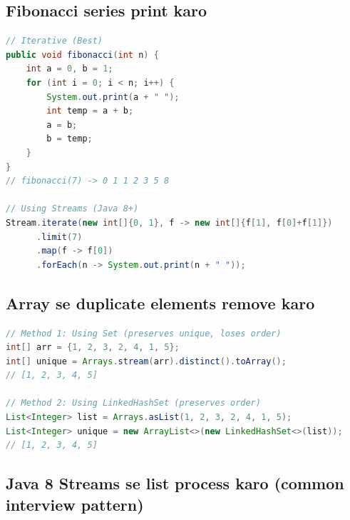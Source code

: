 \documentclass[12pt,a4paper]{article}
\begin{document}
\subsection{Fibonacci series print karo}

\begin{answerbox}
\begin{lstlisting}[language=Java]
// Iterative (Best)
public void fibonacci(int n) {
    int a = 0, b = 1;
    for (int i = 0; i < n; i++) {
        System.out.print(a + " ");
        int temp = a + b;
        a = b;
        b = temp;
    }
}
// fibonacci(7) -> 0 1 1 2 3 5 8

// Using Streams (Java 8+)
Stream.iterate(new int[]{0, 1}, f -> new int[]{f[1], f[0]+f[1]})
      .limit(7)
      .map(f -> f[0])
      .forEach(n -> System.out.print(n + " "));
\end{lstlisting}
\end{answerbox}

\subsection{Array se duplicate elements remove karo}

\begin{answerbox}
\begin{lstlisting}[language=Java]
// Method 1: Using Set (preserves unique, loses order)
int[] arr = {1, 2, 3, 2, 4, 1, 5};
int[] unique = Arrays.stream(arr).distinct().toArray();
// [1, 2, 3, 4, 5]

// Method 2: Using LinkedHashSet (preserves order)
List<Integer> list = Arrays.asList(1, 2, 3, 2, 4, 1, 5);
List<Integer> unique = new ArrayList<>(new LinkedHashSet<>(list));
// [1, 2, 3, 4, 5]
\end{lstlisting}
\end{answerbox}

\subsection{Java 8 Streams se list process karo (common interview pattern)}
\end{document}
